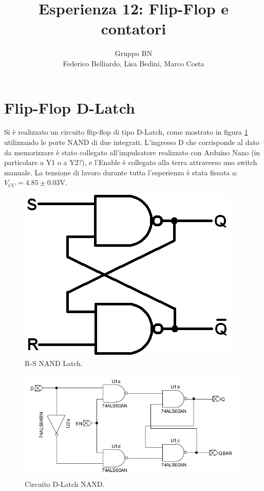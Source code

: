 \documentclass[10pt,a4paper]{article}
\author{Gruppo BN \\ Federico Belliardo, Lisa Bedini, Marco Costa}
\title{Esperienza 12: Flip-Flop e contatori}
\begin{document}
\maketitle

\section{Flip-Flop D-Latch}
Si è realizzato un circuito flip-flop di tipo D-Latch, come mostrato in figura \ref{latch} utilizzando le porte NAND di due integrati. L'ingresso D che corrisponde al dato da memorizzare è stato collegato all'impulsatore realizzato con Arduino Nano (in particolare a Y1 o a Y2?), e l'Enable è collegato alla terra attraverso uno switch manuale. La tensione di lavoro durante tutta l'esperienza è stata fissata a: $V_{CC} = 4.85 \pm 0.03$V.\\


\begin{figure}
\centering
\includegraphics[scale=0.5]{latchNand.png}
\caption{R-S NAND Latch.\label{latch}}
\end{figure}

\begin{figure}
\centering
\includegraphics[scale=0.7]{flipflopDlatch.png}
\caption{Circuito  D-Latch NAND.\label{circuito}}
\end{figure}
\end{document}
